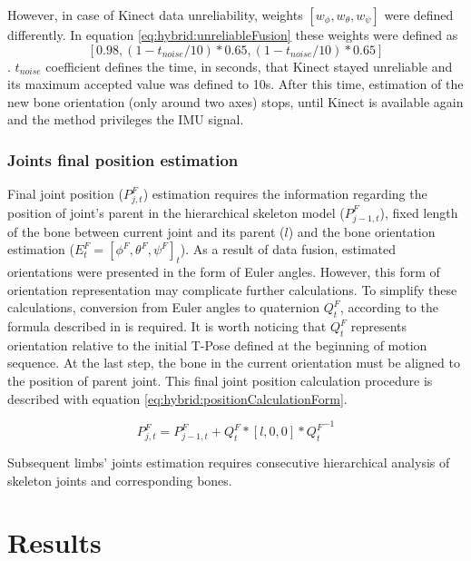 \documentclass[sensors,article,submit,moreauthors,pdftex,10pt,a4paper]{mdpi}
\begin{document}
However, in case of Kinect data unreliability, weights $[w_\phi , w_\theta , w_\psi]$ were defined differently. In equation \ref{eq:hybrid:unreliableFusion} these weights were defined as $$[0.98,(1-t_{noise}/10)*0.65,(1-t_{noise}/10)*0.65]$$. $t_{noise}$ coefficient defines the time, in seconds, that Kinect stayed unreliable and its maximum accepted value was defined to 10s. After this time, estimation of the new bone orientation (only around two axes) stops, until Kinect is available again and the method privileges the IMU signal.

\subsubsection{Joints final position estimation}
Final joint position ($P_{j,t}^F$) estimation requires the information regarding the position of joint’s parent in the hierarchical skeleton model ($P_{j-1,t}^F$), fixed length of the bone between current joint and its parent ($l$) and the bone orientation estimation ($E_t^F=[\phi^F,\theta^F,\psi^F]_t$). As a result of data fusion, estimated orientations were presented in the form of Euler angles. However, this form of orientation representation may complicate further calculations. To simplify these calculations, conversion from Euler angles to quaternion $Q_t^F$, according to the formula described in \cite{Dunn2011} is required. It is worth noticing that $Q_t^F$ represents orientation relative to the initial T-Pose defined at the beginning of motion sequence. At the last step, the bone in the current orientation must be aligned to the position of parent joint. This final joint position calculation procedure is described with equation \ref{eq:hybrid:positionCalculationForm}.

\begin{equation} 	
	P_{j,t}^F=P_{j-1,t}^F+Q_t^F*[l,0,0]*{Q_t^F}^{-1}     
	\label{eq:hybrid:positionCalculationForm}              	
\end{equation}

Subsequent limbs’ joints estimation requires consecutive hierarchical analysis of skeleton joints and corresponding bones.

\section{Results}

\end{document}
